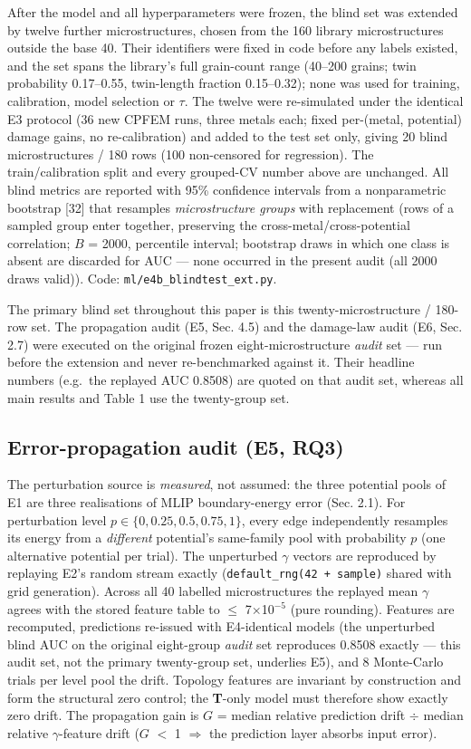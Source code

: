 \documentclass[preprint,12pt]{elsarticle}
\begin{document}
After the model and all hyperparameters were frozen, the blind set was extended by twelve further microstructures, chosen from the 160 library microstructures outside the base 40. Their identifiers were fixed in code before any labels existed, and the set spans the library's full grain-count range (40--200 grains; twin probability 0.17--0.55, twin-length fraction 0.15--0.32); none was used for training, calibration, model selection or $\tau$. The twelve were re-simulated under the identical E3 protocol (36 new CPFEM runs, three metals each; fixed per-(metal, potential) damage gains, no re-calibration) and added to the test set only, giving 20 blind microstructures / 180 rows (100 non-censored for regression). The train/calibration split and every grouped-CV number above are unchanged. All blind metrics are reported with 95\% confidence intervals from a nonparametric bootstrap [32] that resamples \textit{microstructure groups} with replacement (rows of a sampled group enter together, preserving the cross-metal/cross-potential correlation; $B$ = 2000, percentile interval; bootstrap draws in which one class is absent are discarded for AUC --- none occurred in the present audit (all 2000 draws valid)). Code: \texttt{ml/e4b\_blindtest\_ext.py}.

The primary blind set throughout this paper is this twenty-microstructure / 180-row set. The propagation audit (E5, Sec. 4.5) and the damage-law audit (E6, Sec. 2.7) were executed on the original frozen eight-microstructure \textit{audit} set --- run before the extension and never re-benchmarked against it. Their headline numbers (e.g.\ the replayed AUC 0.8508) are quoted on that audit set, whereas all main results and Table 1 use the twenty-group set.

\subsection{Error-propagation audit (E5, RQ3)}

The perturbation source is \textit{measured}, not assumed: the three potential pools of E1 are three realisations of MLIP boundary-energy error (Sec. 2.1). For perturbation level $p \in \{0, 0.25, 0.5, 0.75, 1\}$, every edge independently resamples its energy from a \textit{different} potential's same-family pool with probability $p$ (one alternative potential per trial). The unperturbed $\gamma$ vectors are reproduced by replaying E2's random stream exactly (\texttt{default\_rng(42 + sample)} shared with grid generation). Across all 40 labelled microstructures the replayed mean $\gamma$ agrees with the stored feature table to $\le$ 7$\times$10$^{-5}$ (pure rounding). Features are recomputed, predictions re-issued with E4-identical models (the unperturbed blind AUC on the original eight-group \textit{audit} set reproduces 0.8508 exactly --- this audit set, not the primary twenty-group set, underlies E5), and 8 Monte-Carlo trials per level pool the drift. Topology features are invariant by construction and form the structural zero control; the \textbf{T}-only model must therefore show exactly zero drift. The propagation gain is $G$ = median relative prediction drift $\div$ median relative $\gamma$-feature drift ($G$ $<$ 1 $\Rightarrow$ the prediction layer absorbs input error).
\end{document}
